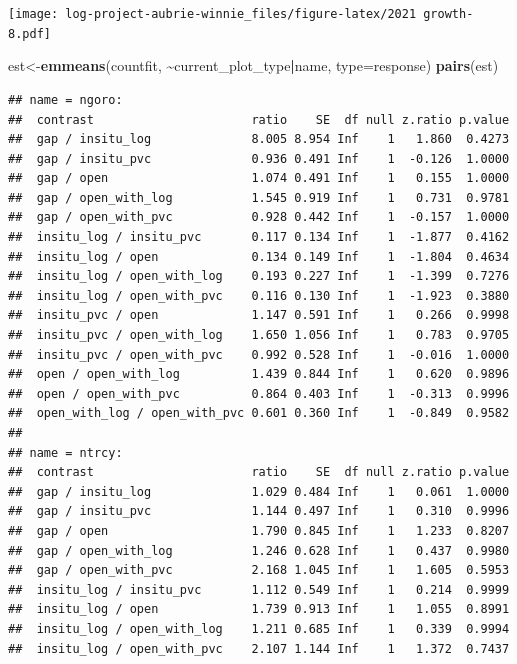 \documentclass[
]{article}
\newenvironment{Shaded}{\begin{snugshade}}{\end{snugshade}}
\newcommand{\AttributeTok}[1]{\textcolor[rgb]{0.13,0.29,0.53}{#1}}
\newcommand{\FunctionTok}[1]{\textcolor[rgb]{0.13,0.29,0.53}{\textbf{#1}}}
\newcommand{\NormalTok}[1]{#1}
\newcommand{\OtherTok}[1]{\textcolor[rgb]{0.56,0.35,0.01}{#1}}
\newcommand{\SpecialCharTok}[1]{\textcolor[rgb]{0.81,0.36,0.00}{\textbf{#1}}}
\newcommand{\StringTok}[1]{\textcolor[rgb]{0.31,0.60,0.02}{#1}}
\begin{document}
\texttt{[image: log-project-aubrie-winnie\_files/figure-latex/2021 growth-8.pdf]}

\begin{Shaded}
\begin{Highlighting}[]
\NormalTok{est}\OtherTok{\textless{}{-}}\FunctionTok{emmeans}\NormalTok{(countfit, }\SpecialCharTok{\textasciitilde{}}\NormalTok{current\_plot\_type}\SpecialCharTok{|}\NormalTok{name, }\AttributeTok{type=}\StringTok{\textquotesingle{}response\textquotesingle{}}\NormalTok{)}
\FunctionTok{pairs}\NormalTok{(est)}
\end{Highlighting}
\end{Shaded}

\begin{verbatim}
## name = ngoro:
##  contrast                      ratio    SE  df null z.ratio p.value
##  gap / insitu_log              8.005 8.954 Inf    1   1.860  0.4273
##  gap / insitu_pvc              0.936 0.491 Inf    1  -0.126  1.0000
##  gap / open                    1.074 0.491 Inf    1   0.155  1.0000
##  gap / open_with_log           1.545 0.919 Inf    1   0.731  0.9781
##  gap / open_with_pvc           0.928 0.442 Inf    1  -0.157  1.0000
##  insitu_log / insitu_pvc       0.117 0.134 Inf    1  -1.877  0.4162
##  insitu_log / open             0.134 0.149 Inf    1  -1.804  0.4634
##  insitu_log / open_with_log    0.193 0.227 Inf    1  -1.399  0.7276
##  insitu_log / open_with_pvc    0.116 0.130 Inf    1  -1.923  0.3880
##  insitu_pvc / open             1.147 0.591 Inf    1   0.266  0.9998
##  insitu_pvc / open_with_log    1.650 1.056 Inf    1   0.783  0.9705
##  insitu_pvc / open_with_pvc    0.992 0.528 Inf    1  -0.016  1.0000
##  open / open_with_log          1.439 0.844 Inf    1   0.620  0.9896
##  open / open_with_pvc          0.864 0.403 Inf    1  -0.313  0.9996
##  open_with_log / open_with_pvc 0.601 0.360 Inf    1  -0.849  0.9582
## 
## name = ntrcy:
##  contrast                      ratio    SE  df null z.ratio p.value
##  gap / insitu_log              1.029 0.484 Inf    1   0.061  1.0000
##  gap / insitu_pvc              1.144 0.497 Inf    1   0.310  0.9996
##  gap / open                    1.790 0.845 Inf    1   1.233  0.8207
##  gap / open_with_log           1.246 0.628 Inf    1   0.437  0.9980
##  gap / open_with_pvc           2.168 1.045 Inf    1   1.605  0.5953
##  insitu_log / insitu_pvc       1.112 0.549 Inf    1   0.214  0.9999
##  insitu_log / open             1.739 0.913 Inf    1   1.055  0.8991
##  insitu_log / open_with_log    1.211 0.685 Inf    1   0.339  0.9994
##  insitu_log / open_with_pvc    2.107 1.144 Inf    1   1.372  0.7437

\end{verbatim}
\end{document}
